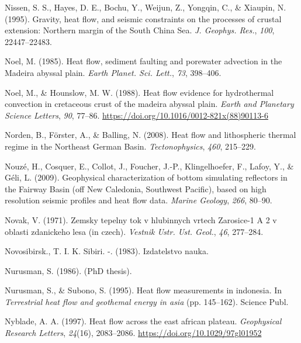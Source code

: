 \begin{CSLReferences}{1}{1}
\leavevmode{}%
Nissen, S. S., Hayes, D. E., Bochu, Y., Weijun, Z., Yongqin, C., \& Xiaupin, N. (1995). Gravity, heat flow, and seismic constraints on the processes of crustal extension: Northern margin of the {South China Sea}. \emph{J. Geophys. Res.}, \emph{100}, 22447--22483.

\leavevmode{}%
Noel, M. (1985). Heat flow, sediment faulting and porewater advection in the {Madeira} abyssal plain. \emph{Earth Planet. Sci. Lett.}, \emph{73}, 398--406.

\leavevmode{}%
Noel, M., \& Hounslow, M. W. (1988). Heat flow evidence for hydrothermal convection in cretaceous crust of the madeira abyssal plain. \emph{Earth and Planetary Science Letters}, \emph{90}, 77--86. \url{https://doi.org/10.1016/0012-821x(88)90113-6}

\leavevmode{}%
Norden, B., Förster, A., \& Balling, N. (2008). Heat flow and lithospheric thermal regime in the {Northeast German Basin}. \emph{Tectonophysics}, \emph{460}, 215--229.

\leavevmode{}%
Nouzé, H., Cosquer, E., Collot, J., Foucher, J.-P., Klingelhoefer, F., Lafoy, Y., \& Géli, L. (2009). Geophysical characterization of bottom simulating reflectors in the {Fairway Basin} (off {New Caledonia, Southwest Pacific}), based on high resolution seismic profiles and heat flow data. \emph{Marine Geology}, \emph{266}, 80--90.

\leavevmode{}%
Novak, V. (1971). Zemsky tepelny tok v hlubinnych vrtech {Zarosice-1 A 2} v oblasti zdanickeho lesa (in czech). \emph{Vestnik Ustr. Ust. Geol.}, \emph{46}, 277--284.

\leavevmode{}%
Novosibirsk., T. I. K. Sibiri. -. (1983). Izdatelstvo nauka.

\leavevmode{}%
Nurusman, S. (1986). (PhD thesis).

\leavevmode{}%
Nurusman, S., \& Subono, S. (1995). Heat flow measurements in indonesia. In \emph{Terrestrial heat flow and geothemal energy in asia} (pp. 145--162). Science Publ.

\leavevmode{}%
Nyblade, A. A. (1997). Heat flow across the east african plateau. \emph{Geophysical Research Letters}, \emph{24}(16), 2083--2086. \url{https://doi.org/10.1029/97gl01952}


\end{CSLReferences}
